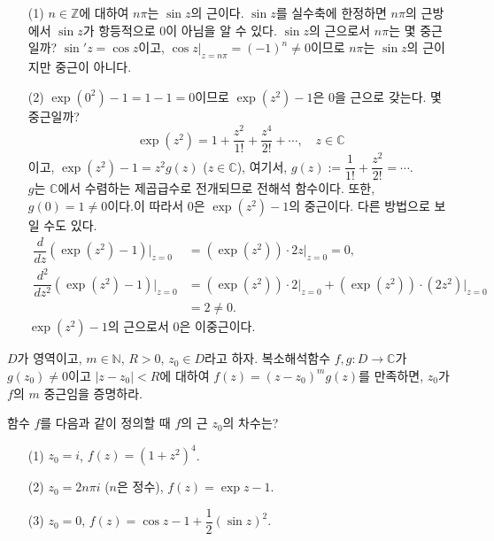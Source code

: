\begin{saltexample}[label=example-4-6]{}{}
\begin{itemize}
\item[(1)] $n\in \mathbb Z$에 대하여 $n\pi$는 $\sin z$의 근이다.
$\sin z$를 실수축에 한정하면 $n\pi$의 근방에서 
$\sin z$가 항등적으로 $0$이 아님을 알 수 있다.
$\sin z$의 근으로서 $n\pi$는 몇 중근일까?
$\sin' z = \cos z$이고, $\cos z \Big|_{z=n\pi}= (-1)^n \ne 0$이므로
$n\pi$는 $\sin z$의 근이지만 중근이 아니다.
\item[(2)] $\exp(0^2) -1 = 1-1 = 0$이므로
$\exp (z^2) -1$은 $0$을 근으로 갖는다.
몇 중근일까?
\[
\exp (z^2) = 1 + \dfrac{z^2}{1!} + \dfrac{z^4}{2!} + \cdots,
\quad z\in \mathbb C
\]
이고, $\exp(z^2) -1 = z^2g(z)$ ($z\in \mathbb C$),
여기서, $g(z):= \dfrac1{1!} + \dfrac{z^2}{2!} = \cdots$. \\
$g$는 $\mathbb C$에서 수렴하는  제곱급수로 전개되므로
전해석 함수이다. 또한, $g(0)=1\ne 0$이다.이
따라서 $0$은 $\exp(z^2) -1$의 중근이다.
다른 방법으로 보일 수도 있다.
\begin{align*}
\dfrac{d}{dz} (\exp(z^2)-1) \Big|_{z=0} 
&= (\exp(z^2))\cdot 2z  \Big|_{z=0}  = 0, \\
\dfrac{d^2}{dz^2} (\exp(z^2)-1)\Big|_{z=0} 
&=  (\exp(z^2))\cdot 2 \Big|_{z=0}  +  (\exp(z^2))\cdot (2z^2)  \Big|_{z=0}  \\
&= 2\ne 0.
\end{align*}
$\exp(z^2) -1$의 근으로서 $0$은 이중근이다.
\end{itemize}
\end{saltexample}

\begin{salt_exercise} \label{ex-4-17}
$D$가 영역이고, $m\in \mathbb N$, $R>0$, $z_0\in D$라고 하자.
복소해석함수 $f,g: D\to \mathbb C$가 $g(z_0)\ne0$이고
$|z-z_0|<R$에 대하여 $f(z) = (z-z_0)^m g(z)$를 만족하면,
$z_0$가 $f$의 $m$ 중근임을 증명하라.
\end{salt_exercise}

\begin{salt_exercise} \label{ex-4-18}
함수 $f$를 다음과 같이 정의할 때 $f$의 근 $z_0$의 차수는?
\begin{itemize}
\item[(1)]  $z_0 = i$, $f(z) = (1+z^2)^4$.
\item[(2)]  $z_0 = 2n\pi i$ ($n$은 정수), $f(z) = \exp z -1$.
\item[(3)] $z_0=0$, $f(z) = \cos z - 1 + \dfrac12(\sin z)^2$.
\end{itemize}
\end{salt_exercise}

